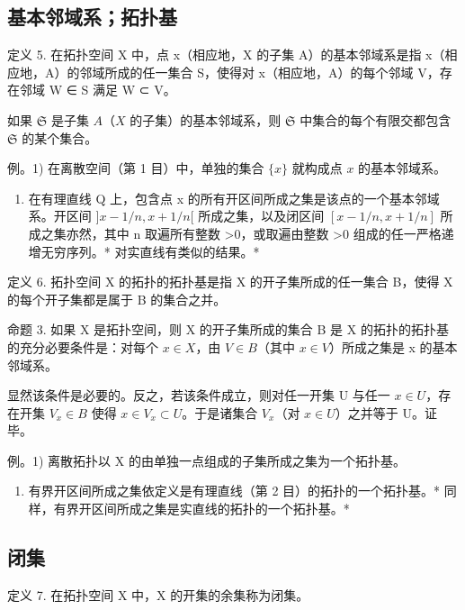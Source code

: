 \subsection{基本邻域系；拓扑基}

定义 5. 在拓扑空间 X 中，点 x（相应地，X 的子集 A）的基本邻域系是指 x（相应地，A）的邻域所成的任一集合 S，使得对 x（相应地，A）的每个邻域 V，存在邻域 W ∈ S 满足 W ⊂ V。

如果 \(\mathfrak{S}\) 是子集 \(A\)（\(X\) 的子集）的基本邻域系，则 \(\mathfrak{S}\) 中集合的每个有限交都包含 \(\mathfrak{S}\) 的某个集合。

例。1) 在离散空间（第 1 目）中，单独的集合 \(\{x\}\) 就构成点 \(x\) 的基本邻域系。

\begin{enumerate}
\def\labelenumi{\arabic{enumi})}
\setcounter{enumi}{1}
\tightlist
\item
  在有理直线 Q 上，包含点 x 的所有开区间所成之集是该点的一个基本邻域系。开区间 \(]x - 1/n, x + 1/n[\) 所成之集，以及闭区间 \([x - 1/n, x + 1/n]\) 所成之集亦然，其中 n 取遍所有整数 \textgreater0，或取遍由整数 \textgreater0 组成的任一严格递增无穷序列。* 对实直线有类似的结果。*
\end{enumerate}

定义 6. 拓扑空间 X 的拓扑的拓扑基是指 X 的开子集所成的任一集合 B，使得 X 的每个开子集都是属于 B 的集合之并。

命题 3. 如果 X 是拓扑空间，则 X 的开子集所成的集合 B 是 X 的拓扑的拓扑基的充分必要条件是：对每个 \(x \in X\)，由 \(V \in B\)（其中 \(x \in V\)）所成之集是 x 的基本邻域系。

显然该条件是必要的。反之，若该条件成立，则对任一开集 U 与任一 \(x \in U\)，存在开集 \(V_{x} \in B\) 使得 \(x \in V_{x} \subset U\)。于是诸集合 \(V_{x}\)（对 \(x \in U\)）之并等于 U。证毕。

例。1) 离散拓扑以 X 的由单独一点组成的子集所成之集为一个拓扑基。

\begin{enumerate}
\def\labelenumi{\arabic{enumi})}
\setcounter{enumi}{1}
\tightlist
\item
  有界开区间所成之集依定义是有理直线（第 2 目）的拓扑的一个拓扑基。* 同样，有界开区间所成之集是实直线的拓扑的一个拓扑基。*
\end{enumerate}

\subsection{闭集}

定义 7. 在拓扑空间 X 中，X 的开集的余集称为闭集。

